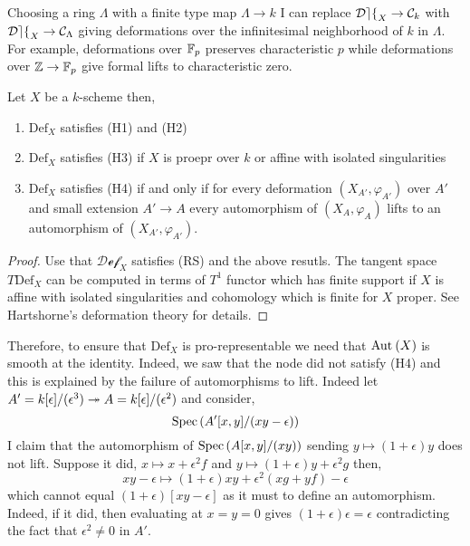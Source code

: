 \documentclass[12pt]{article}
\newcommand{\Def}{\mathrm{Def}}
\newcommand{\cDef}{\mathcal{Def}}
\begin{document}
\begin{rmk}
Choosing a ring $\Lambda$ with a finite type map $\Lambda \to k$ I can replace $\cDef_X \to \C_k$ with $\cDef_X \to \C_\Lambda$ giving deformations over the infinitesimal neighborhood of $k$ in $\Lambda$. For example, deformations over $\mathbb{F}_p$ preserves characteristic $p$ while deformations over $\mathbb{Z} \to \mathbb{F}_p$ give formal lifts to characteristic zero.
\end{rmk}

\begin{prop}
Let $X$ be a $k$-scheme then,
\begin{enumerate}
\item $\Def_X$ satisfies (H1) and (H2)
\item $\Def_X$ satisfies (H3) if $X$ is proepr over $k$ or affine with isolated singularities
\item $\Def_X$ satisfies (H4) if and only if for every deformation $(X_{A'}, \varphi_{A'})$ over $A'$ and small extension $A' \to A$ every automorphism of $(X_A, \varphi_A)$ lifts to an automorphism of $(X_{A'}, \varphi_{A'})$.
\end{enumerate}
\end{prop}

\begin{proof}
Use that $\cDef_X$ satisfies (RS) and the above resutls. The tangent space $T \Def_X$ can be computed in terms of $T^1$ functor which has finite support if $X$ is affine with isolated singularities and cohomology which is finite for $X$ proper. See Hartshorne's deformation theory for details. 
\end{proof}

\begin{rmk}
Therefore, to ensure that $\Def_X$ is pro-representable we need that $\mathrm{Aut}_{} \left( X \right)$ is smooth at the identity. Indeed, we saw that the node did not satisfy (H4) and this is explained by the failure of automorphisms to lift. Indeed let $A' = k[\epsilon]/(\epsilon^3) \twoheadrightarrow A = k[\epsilon]/(\epsilon^2)$ and consider,
\[ \mathrm{Spec}\left( A'[x,y]/(xy - \epsilon) \right) \]
I claim that the automorphism of $\mathrm{Spec}\left( A[x,y]/(xy) \right)$ sending $y \mapsto (1 + \epsilon) y$ does not lift. Suppose it did, $x \mapsto x + \epsilon^2 f$ and $y \mapsto (1 + \epsilon) y + \epsilon^2 g$ then,
\[ xy - \epsilon \mapsto (1 + \epsilon) xy + \epsilon^2 (x g + y f) - \epsilon \]
which cannot equal $(1 + \epsilon) [xy - \epsilon]$ as it must to define an automorphism. Indeed, if it did, then evaluating at $x = y = 0$ gives $(1 + \epsilon) \epsilon = \epsilon$ contradicting the fact that $\epsilon^2 \neq 0$ in $A'$.
\end{rmk}
\end{document}
